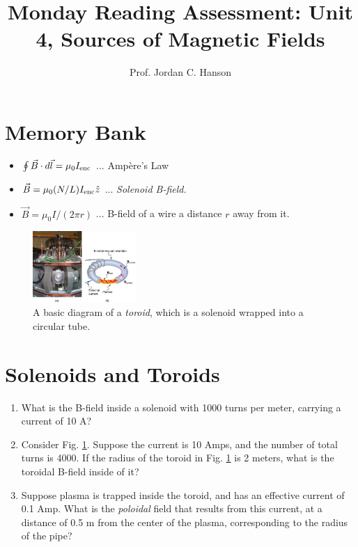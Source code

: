 \documentclass{article}
\begin{document}
\title{Monday Reading Assessment: Unit 4, Sources of Magnetic Fields}
\author{Prof. Jordan C. Hanson}

\maketitle

\section{Memory Bank}

\begin{itemize}
\item $\oint \vec{B} \cdot d\vec{l} = \mu_0 I_{\rm enc}$ ... Amp\`{e}re's Law
\item $\vec{B} = \mu_0 (N/L) I_{\rm enc} \hat{z}$ ... \textit{Solenoid B-field.}
\item $\vec{B} = \mu_0 I / (2\pi r)$ ... B-field of a wire a distance $r$ away from it.
\end{itemize}

\begin{figure}[ht]
\centering
\includegraphics[width=0.35\textwidth,trim=8.5cm 1cm 0cm 3cm,clip=true]{toroid.jpeg}
\caption{\label{fig:fields} A basic diagram of a \textit{toroid}, which is a solenoid wrapped into a circular tube.}
\end{figure}

\section{Solenoids and Toroids}

\begin{enumerate}
\item What is the B-field inside a solenoid with 1000 turns per meter, carrying a current of 10 A? \\ \vspace{1cm}
\item Consider Fig. \ref{fig:fields}.  Suppose the current is 10 Amps, and the number of total turns is 4000.  If the radius of the toroid in Fig. \ref{fig:fields} is 2 meters, what is the toroidal B-field inside of it? \\ \vspace{2cm}
\item Suppose plasma is trapped inside the toroid, and has an effective current of 0.1 Amp.  What is the \textit{poloidal} field that results from this current, at a distance of 0.5 m from the center of the plasma, corresponding to the radius of the pipe?
\end{enumerate}
\end{document}
